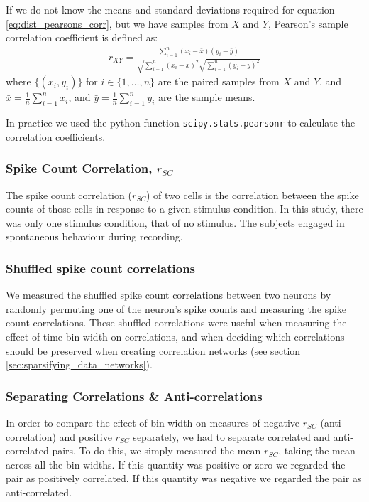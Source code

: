 \documentclass[a4paper,12pt]{article}
\theoremstyle{definition}
\begin{document}
    If we do not know the means and standard deviations required for equation \ref{eq:dist_pearsons_corr}, but we have samples from $X$ and $Y$, Pearson's sample correlation coefficient is defined as:
    \begin{align}
        r_{XY} = \frac{\sum_{i=1}^n (x_i - \bar{x})(y_i - \bar{y})}{\sqrt{\sum_{i=1}^n (x_i - \bar{x})^2}\sqrt{\sum_{i=1}^n (y_i - \bar{y})^2}}
    \end{align}
    where $\lbrace (x_i, y_i) \rbrace$ for $i \in \lbrace 1, \dots, n \rbrace$ are the paired samples from $X$ and $Y$, and $\bar{x} = \frac{1}{n}\sum_{i=1}^n x_i$, and $\bar{y} = \frac{1}{n}\sum_{i=1}^n y_i$ are the sample means.

    In practice we used the python function \texttt{scipy.stats.pearsonr} to calculate the correlation coefficients.

        \subsubsection{Spike Count Correlation, $r_{SC}$}\label{sec:spike_count_correlation}
        The spike count correlation ($r_{SC}$) of two cells is the correlation between the spike counts of those cells in response to a given stimulus condition. In this study, there was only one stimulus condition, that of no stimulus. The subjects engaged in spontaneous behaviour during recording.

        \subsubsection{Shuffled spike count correlations}\label{sec:shuffled_correlations}
        We measured the shuffled spike count correlations between two neurons by randomly permuting one of the neuron's spike counts and measuring the spike count correlations. These shuffled correlations were useful when measuring the effect of time bin width on correlations, and when deciding which correlations should be preserved when creating correlation networks (see section \ref{sec:sparsifying_data_networks}).

        \subsubsection{Separating Correlations \& Anti-correlations}\label{sec:corr_anti_corr}
        In order to compare the effect of bin width on measures of negative $r_{SC}$ (anti-correlation) and positive $r_{SC}$ separately, we had to separate correlated and anti-correlated pairs. To do this, we simply measured the mean $r_{SC}$, taking the mean across all the bin widths. If this quantity was positive or zero we regarded the pair as positively correlated. If this quantity was negative we regarded the pair as anti-correlated.
\end{document}
